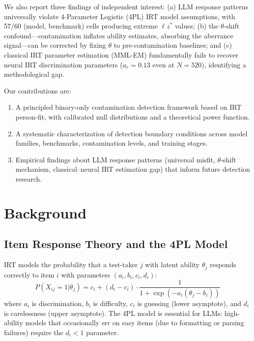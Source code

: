 \documentclass[11pt,a4paper]{article}
\newcommand{\lzstar}{\ensuremath{\ell z^*}}
\begin{document}
We also report three findings of independent interest: (a) LLM response patterns universally violate 4-Parameter Logistic (4PL) IRT model assumptions, with 57/60 (model, benchmark) cells producing extreme $\lzstar$ values; (b) the $\theta$-shift confound---contamination inflates ability estimates, absorbing the aberrance signal---can be corrected by fixing $\theta$ to pre-contamination baselines; and (c) classical IRT parameter estimation (MML-EM) fundamentally fails to recover neural IRT discrimination parameters ($a_r=0.13$ even at $N=520$), identifying a methodological gap.

Our contributions are:
\begin{enumerate}
\item A principled binary-only contamination detection framework based on IRT person-fit, with calibrated null distributions and a theoretical power function.
\item A systematic characterization of detection boundary conditions across model families, benchmarks, contamination levels, and training stages.
\item Empirical findings about LLM response patterns (universal misfit, $\theta$-shift mechanism, classical--neural IRT estimation gap) that inform future detection research.
\end{enumerate}

\section{Background}

\subsection{Item Response Theory and the 4PL Model}

IRT models the probability that a test-taker $j$ with latent ability $\theta_j$ responds correctly to item $i$ with parameters $(a_i, b_i, c_i, d_i)$:
\begin{equation}
P(X_{ij}=1|\theta_j) = c_i + (d_i - c_i) \cdot \frac{1}{1 + \exp(-a_i(\theta_j - b_i))}
\label{eq:4pl}
\end{equation}
where $a_i$ is discrimination, $b_i$ is difficulty, $c_i$ is guessing (lower asymptote), and $d_i$ is carelessness (upper asymptote).
The 4PL model is essential for LLMs: high-ability models that occasionally err on easy items (due to formatting or parsing failures) require the $d_i < 1$ parameter.
\end{document}
